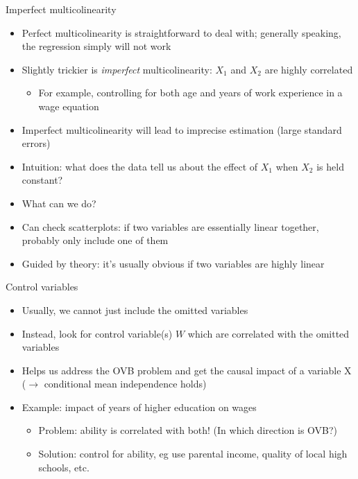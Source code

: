 \documentclass[aspectratio=169]{beamer}
\begin{document}
\begin{frame}{Imperfect multicolinearity}
    \begin{itemize}
        \item Perfect multicolinearity is straightforward to deal with; generally speaking, the regression simply will not work
        \item Slightly trickier is \textit{imperfect} multicolinearity: $X_1$ and $X_2$ are highly correlated
        \begin{itemize}
            \item For example, controlling for both age and years of work experience in a wage equation
        \end{itemize}
        \item Imperfect multicolinearity will lead to imprecise estimation (large standard errors)
        \item Intuition: what does the data tell us about the effect of $X_1$ when $X_2$ is held constant?
        
        \pause

        \item What can we do?

        \pause

        \item Can check scatterplots: if two variables are essentially linear together, probably only include one of them
        \item Guided by theory: it's usually obvious if two variables are highly linear
    \end{itemize}
\end{frame}

\begin{frame}{Control variables}
    \begin{itemize}
        \item Usually, we cannot just include the omitted variables
        \item Instead, look for control variable(s) $W$ which are correlated with the omitted variables
        \item Helps us address the OVB problem and get the causal impact of a variable X ($\to$ conditional mean independence holds)
        \item Example: impact of years of higher education on wages
        \begin{itemize}
            \item Problem: ability is correlated with both! (In which direction is OVB?)
            \item Solution: control for ability, eg use parental income, quality of local high schools, etc.
        \end{itemize}
    \end{itemize}
\end{frame}
\end{document}
